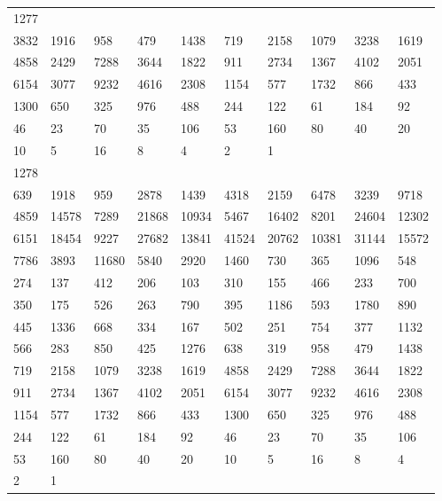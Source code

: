 \begin{longtable}{*{10}{l}}
1277&&&&&&&&&\\
3832& 1916& 958& 479& 1438& 719& 2158& 1079& 3238& 1619\\
4858& 2429& 7288& 3644& 1822& 911& 2734& 1367& 4102& 2051\\
6154& 3077& 9232& 4616& 2308& 1154& 577& 1732& 866& 433\\
1300& 650& 325& 976& 488& 244& 122& 61& 184& 92\\
46& 23& 70& 35& 106& 53& 160& 80& 40& 20\\
10& 5& 16& 8& 4& 2& 1& \\

1278&&&&&&&&&\\
639& 1918& 959& 2878& 1439& 4318& 2159& 6478& 3239& 9718\\
4859& 14578& 7289& 21868& 10934& 5467& 16402& 8201& 24604& 12302\\
6151& 18454& 9227& 27682& 13841& 41524& 20762& 10381& 31144& 15572\\
7786& 3893& 11680& 5840& 2920& 1460& 730& 365& 1096& 548\\
274& 137& 412& 206& 103& 310& 155& 466& 233& 700\\
350& 175& 526& 263& 790& 395& 1186& 593& 1780& 890\\
445& 1336& 668& 334& 167& 502& 251& 754& 377& 1132\\
566& 283& 850& 425& 1276& 638& 319& 958& 479& 1438\\
719& 2158& 1079& 3238& 1619& 4858& 2429& 7288& 3644& 1822\\
911& 2734& 1367& 4102& 2051& 6154& 3077& 9232& 4616& 2308\\
1154& 577& 1732& 866& 433& 1300& 650& 325& 976& 488\\
244& 122& 61& 184& 92& 46& 23& 70& 35& 106\\
53& 160& 80& 40& 20& 10& 5& 16& 8& 4\\
2& 1& \\


\end{longtable}
